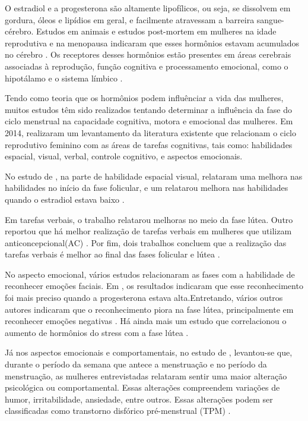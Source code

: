 O estradiol e a progesterona são altamente lipofílicos, ou seja, se dissolvem em gordura, óleos e lipídios em geral, e facilmente atravessam a barreira sangue-cérebro. Estudos em animais e estudos post-mortem em mulheres na idade reprodutiva e na menopausa indicaram que esses hormônios estavam acumulados no cérebro \cite{bixo1997}. Os receptores desses hormônios estão presentes em áreas cerebrais associadas à reprodução, função cognitiva e processamento emocional, como o hipotálamo e o sistema límbico \cite{gruber2002, brinton2008}.

Tendo como teoria que os hormônios podem influênciar a vida das mulheres, muitos estudos têm sido realizados tentando determinar a influência da fase do ciclo menstrual na capacidade cognitiva, motora e emocional das mulheres. Em 2014,  realizaram um levantamento da literatura existente que relacionam o ciclo reprodutivo feminino com as áreas de tarefas cognitivas, tais como: habilidades espacial, visual, verbal, controle cognitivo, e aspectos emocionais.

No estudo de , na parte de habilidade espacial visual, \cite{hausmann2000, maki2002, courvoisier2013, becker1982, phillips1992} relataram uma melhora nas habilidades no início da fase folicular, e um relatarou melhora nas habilidades quando o estradiol estava baixo \cite{hampson2014}. 

Em tarefas verbais, o trabalho \cite{maki2002} relatarou melhoras no meio da fase lútea. Outro reportou que há melhor realização de tarefas verbais em mulheres que utilizam anticoncepcional(AC) \cite{mordecai2008}. Por fim, dois trabalhos concluem que a realização das tarefas verbais é melhor ao final das fases folicular e lútea \cite{Rosenberg2002, solis2004}.

No aspecto emocional, vários estudos relacionaram as fases com a habilidade de reconhecer emoções faciais. Em , os resultados indicaram que esse reconhecimento foi mais preciso quando a progesterona estava alta.Entretando, vários outros autores indicaram que o reconhecimento piora na fase lútea, principalmente em reconhecer emoções negativas \cite{gasbarri2008}. Há ainda mais um estudo que correlacionou o aumento de hormônios do stress com a fase lútea \cite{kirschbaum1999}.

Já nos aspectos emocionais e comportamentais, no estudo de , levantou-se que, durante o período da semana que antece a menstruação e no período da menstruação, as mulheres entrevistadas relataram sentir uma maior alteração psicológica ou comportamental. Essas alterações compreendem variações de humor, irritabilidade, ansiedade, entre outros. Essas alterações podem ser classificadas como transtorno disfórico pré-menstrual (TPM) \cite{ACOG2000}.


